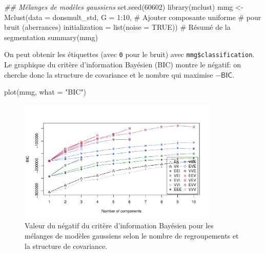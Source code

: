 \documentclass[
  11pt,
  letterpaper,
]{scrbook}
\newenvironment{Shaded}{\begin{snugshade}}{\end{snugshade}}
\newcommand{\AttributeTok}[1]{\textcolor[rgb]{0.40,0.45,0.13}{#1}}
\newcommand{\CommentTok}[1]{\textcolor[rgb]{0.37,0.37,0.37}{#1}}
\newcommand{\ConstantTok}[1]{\textcolor[rgb]{0.56,0.35,0.01}{#1}}
\newcommand{\DecValTok}[1]{\textcolor[rgb]{0.68,0.00,0.00}{#1}}
\newcommand{\DocumentationTok}[1]{\textcolor[rgb]{0.37,0.37,0.37}{\textit{#1}}}
\newcommand{\FunctionTok}[1]{\textcolor[rgb]{0.28,0.35,0.67}{#1}}
\newcommand{\NormalTok}[1]{\textcolor[rgb]{0.00,0.23,0.31}{#1}}
\newcommand{\OtherTok}[1]{\textcolor[rgb]{0.00,0.23,0.31}{#1}}
\newcommand{\SpecialCharTok}[1]{\textcolor[rgb]{0.37,0.37,0.37}{#1}}
\newcommand{\StringTok}[1]{\textcolor[rgb]{0.13,0.47,0.30}{#1}}
\theoremstyle{definition}
\theoremstyle{remark}
\begin{document}
\begin{Shaded}
\begin{Highlighting}[]
\DocumentationTok{\#\# Mélanges de modèles gaussiens}
\FunctionTok{set.seed}\NormalTok{(}\DecValTok{60602}\NormalTok{)}
\FunctionTok{library}\NormalTok{(mclust)}
\NormalTok{mmg }\OtherTok{\textless{}{-}} \FunctionTok{Mclust}\NormalTok{(}\AttributeTok{data =}\NormalTok{ donsmult\_std,}
       \AttributeTok{G =} \DecValTok{1}\SpecialCharTok{:}\DecValTok{10}\NormalTok{,}
       \CommentTok{\# Ajouter composante uniforme}
       \CommentTok{\#  pour bruit (aberrances)}
       \AttributeTok{initialization =} \FunctionTok{list}\NormalTok{(}\AttributeTok{noise =} \ConstantTok{TRUE}\NormalTok{))}
\CommentTok{\# Résumé de la segmentation}
\FunctionTok{summary}\NormalTok{(mmg)}
\end{Highlighting}
\end{Shaded}

On peut obtenir les étiquettes (avec \texttt{0} pour le bruit) avec
\texttt{mmg\$classification}. Le graphique du critère d'information
Bayésien (BIC) montre le négatif: on cherche donc la structure de
covariance et le nombre qui maximise \(-\mathsf{BIC}\).

\begin{Shaded}
\begin{Highlighting}[]
\FunctionTok{plot}\NormalTok{(mmg, }\AttributeTok{what =} \StringTok{"BIC"}\NormalTok{)}
\end{Highlighting}
\end{Shaded}

\begin{figure}[ht!]

{\centering \includegraphics[width=0.85\textwidth,height=\textheight]{regroupements_files/figure-pdf/fig-mclustbic-1.pdf}

}

\caption{\label{fig-mclustbic}Valeur du négatif du critère d'information
Bayésien pour les mélanges de modèles gaussiens selon le nombre de
regroupements et la structure de covariance.}

\end{figure}
\end{document}
